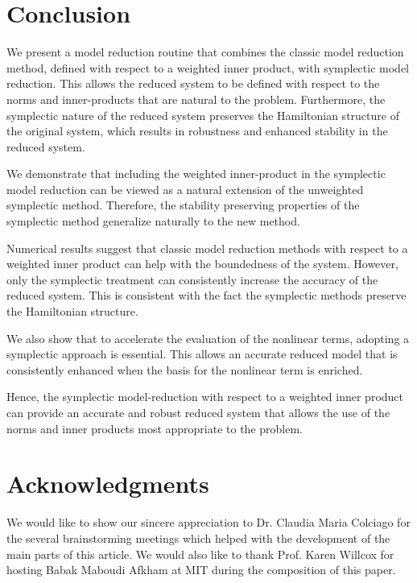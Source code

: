 \section{Conclusion} \label{sec:conc}
We present a model reduction routine that combines the classic model reduction method, defined with respect to a weighted inner product, with symplectic model reduction. This allows the reduced system to be defined with respect to the norms and inner-products that are natural to the problem. Furthermore, the symplectic nature of the reduced system preserves the Hamiltonian structure of the original system, which results in robustness and enhanced stability in the reduced system.

We demonstrate that including the weighted inner-product in the symplectic model reduction can be viewed as a natural extension of the unweighted symplectic method. Therefore, the stability preserving properties of the symplectic method generalize naturally to the new method.

Numerical results suggest that classic model reduction methods with respect to a weighted inner product can help with the boundedness of the system. However, only the symplectic treatment can consistently increase the accuracy of the reduced system. This is consistent with the fact the symplectic methods preserve the Hamiltonian structure.

We also show that to accelerate the evaluation of the nonlinear terms, adopting a symplectic approach is essential. This allows an accurate reduced model that is consistently enhanced when the basis for the nonlinear term is enriched.

Hence, the symplectic model-reduction with respect to a weighted inner product can provide an accurate and robust reduced system that allows the use of the norms and inner products most appropriate to the problem.

\section*{Acknowledgments} We would like to show our sincere appreciation to Dr. Claudia Maria Colciago for the several brainstorming meetings which helped with the development of the main parts of this article. We would also like to thank Prof. Karen Willcox for hosting Babak Maboudi Afkham at MIT during the composition of this paper. 
